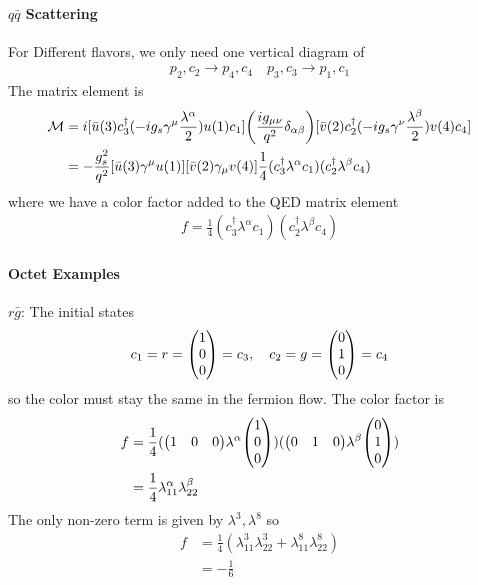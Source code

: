 \documentclass[../main.tex]{subfiles}
\begin{document}
\paragraph*{$q\bar q$ Scattering}
For Different flavors, we only need one vertical diagram of
\begin{align*}
    p_2, c_2 \to p_4, c_4 \quad p_3, c_3 \to p_1, c_1
\end{align*}
The matrix element is
\begin{align*}
    \mathcal{M} &= i [\bar u(3) c_3^\dagger (-ig_s \gamma^\mu \frac{\lambda^\alpha}{2}) u(1) c_1]
    \qt(\frac{i g_{\mu\nu}}{q^2} \delta_{\alpha\beta})[\bar v(2) c_2^\dagger (-ig_s \gamma^\nu \frac{\lambda^\beta}{2}) v(4) c_4] \\
    &= -\frac{g_s^2}{q^2} [\bar u(3) \gamma^\mu u(1)][\bar v(2) \gamma_\mu v(4)] \frac{1}{4} (c_3^\dagger \lambda^\alpha c_1)(c_2^\dagger \lambda^\beta c_4)
\end{align*}
where we have a color factor added to the QED matrix element
\begin{align*}
    f = \frac{1}{4} (c_3^\dagger \lambda^\alpha c_1)(c_2^\dagger \lambda^\beta c_4)
\end{align*}
\paragraph*{Octet Examples}
$r \bar g$: The initial states 
\begin{align*}
    c_1 = r = \mqty(1 \\ 0 \\ 0) = c_3, \quad c_2 = g = \mqty(0 \\ 1 \\ 0) = c_4
\end{align*}
so the color must stay the same in the fermion flow. The color factor is
\begin{align*}
    f &= \frac{1}{4} (\mqty(1 & 0 & 0) \lambda^\alpha \mqty(1 \\ 0 \\ 0))(\mqty(0 & 1 & 0) \lambda^\beta \mqty(0 \\ 1 \\ 0)) \\
    &= \frac{1}{4} \lambda^\alpha_{11} \lambda^\beta_{22}
\end{align*} 
The only non-zero term is given by $\lambda^3, \lambda^8$ so
\begin{align*}
    f &= \frac{1}{4} (\lambda_{11}^3 \lambda_{22}^3 + \lambda_{11}^8 \lambda_{22}^8) \\
    &= -\frac{1}{6}
\end{align*}
\end{document}
